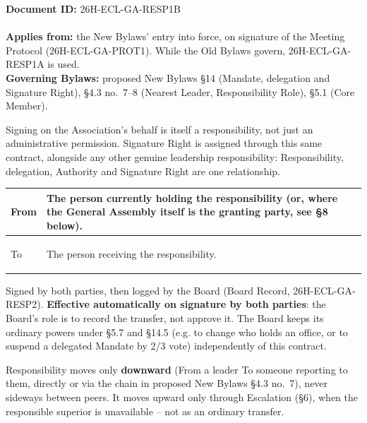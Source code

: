 \documentclass{../../../Common/Latex/Templates/rapport}
\date{\meetingdate, \meetingtime}
\begin{document}
\makecoverpage
\tableofcontents
\reportmainmatter

\noindent\textbf{Document ID:} 26H-ECL-GA-RESP1B\\
\meetingline\\
\textbf{Applies from:} the New Bylaws' entry into force, on signature of the Meeting Protocol (26H-ECL-GA-PROT1). While the Old Bylaws govern, 26H-ECL-GA-RESP1A is used.\\
\textbf{Governing Bylaws:} proposed New Bylaws \S14 (Mandate, delegation and Signature Right), \S4.3 no.\ 7--8 (Nearest Leader, Responsibility Role), \S5.1 (Core Member).

Signing on the Association's behalf is itself a responsibility, not just an administrative permission. Signature Right is assigned through this same contract, alongside any other genuine leadership responsibility: Responsibility, delegation, Authority and Signature Right are one relationship.

\begin{tabularx}{\textwidth}{|>{\bfseries\raggedright\arraybackslash}p{3cm}|X|}
  \hline
  From & \rule{0pt}{1cm}The person currently holding the responsibility (or, where the General Assembly itself is the granting party, see \S8 below). \\
  \hline
  To   & \rule{0pt}{1cm}The person receiving the responsibility.                                                                                      \\
  \hline
\end{tabularx}

Signed by both parties, then logged by the Board (Board Record, 26H-ECL-GA-RESP2). \textbf{Effective automatically on signature by both parties}: the Board's role is to record the transfer, not approve it. The Board keeps its ordinary powers under \S5.7 and \S14.5 (e.g. to change who holds an office, or to suspend a delegated Mandate by 2/3 vote) independently of this contract.

Responsibility moves only \textbf{downward} (From a leader To someone reporting to them, directly or via the chain in proposed New Bylaws \S4.3 no.\ 7), never sideways between peers. It moves upward only through Escalation (\S6), when the responsible superior is unavailable -- not as an ordinary transfer.
\end{document}

